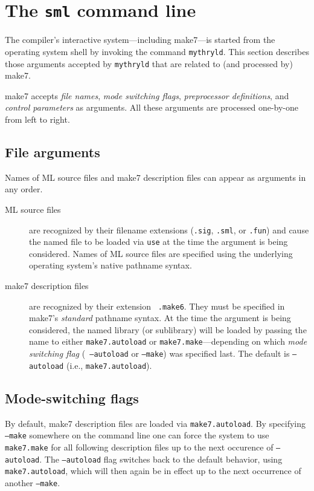 
\section{The {\tt sml} command line}
\label{sec:cmdline}

The compiler's interactive system---including make7---is started from the
operating system shell by invoking the command {\tt mythryld}.
This section describes those arguments accepted by {\tt mythryld} that
are related to (and processed by) make7.

make7 accepts {\em file names}, {\em mode switching flags}, {\em
preprocessor definitions}, and {\em control parameters} as arguments.
All these arguments are processed one-by-one from left to right.

\subsection{File arguments}

Names of ML source files and make7 description files can appear as
arguments in any order.

\begin{description}
\item[ML source files] are recognized by their filename extensions
({\tt .sig}, {\tt .sml}, or {\tt .fun}) and cause the named file to be
loaded via {\tt use} at the time the argument is being considered.
Names of ML source files are specified using the underlying operating
system's native pathname syntax.
\item[make7 description files] are recognized by their extension {\tt
.make6}.  They must be specified in make7's {\em standard} pathname syntax.
At the time the argument is being considered, the named library (or
sublibrary) will be loaded by passing the name to either {\tt make7.autoload}
or {\tt make7.make}---depending on which {\em mode switching flag} ({\tt
--autoload} or {\tt --make}) was specified last.  The default is {\tt --autoload}
(i.e., {\tt make7.autoload}).
\end{description}

\subsection{Mode-switching flags}

By default, make7 description files are loaded via {\tt make7.autoload}.  By
specifying {\tt --make} somewhere on the command line one can force the
system to use {\tt make7.make} for all following description files up to
the next occurence of {\tt --autoload}.  The {\tt --autoload} flag switches
back to the default behavior, using {\tt make7.autoload}, which will then
again be in effect up to the next occurrence of another {\tt --make}.

